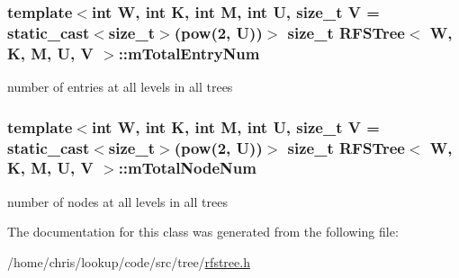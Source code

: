 \hypertarget{classRFSTree_a8e2de7140778be6a4167b6d35b3f2846}{
\subsubsection[{m\-Total\-Entry\-Num}]{\setlength{\rightskip}{0pt plus 5cm}template$<$int W, int K, int M, int U, size\-\_\-t V = static\-\_\-cast$<$size\-\_\-t$>$(pow(2, U))$>$ size\-\_\-t {\bf R\-F\-S\-Tree}$<$ {\bf W}, K, M, U, V $>$\-::m\-Total\-Entry\-Num\hspace{0.3cm}{\ttfamily [private]}}}\label{classRFSTree_a8e2de7140778be6a4167b6d35b3f2846}


number of entries at all levels in all trees 

\hypertarget{classRFSTree_ae0df04978b8fb52d4706716854818eff}{
\subsubsection[{m\-Total\-Node\-Num}]{\setlength{\rightskip}{0pt plus 5cm}template$<$int W, int K, int M, int U, size\-\_\-t V = static\-\_\-cast$<$size\-\_\-t$>$(pow(2, U))$>$ size\-\_\-t {\bf R\-F\-S\-Tree}$<$ {\bf W}, K, M, U, V $>$\-::m\-Total\-Node\-Num\hspace{0.3cm}{\ttfamily [private]}}}\label{classRFSTree_ae0df04978b8fb52d4706716854818eff}


number of nodes at all levels in all trees 



The documentation for this class was generated from the following file\-:\begin{DoxyCompactItemize}
\item 
/home/chris/lookup/code/src/tree/\hyperlink{rfstree_8h}{rfstree.\-h}\end{DoxyCompactItemize}
